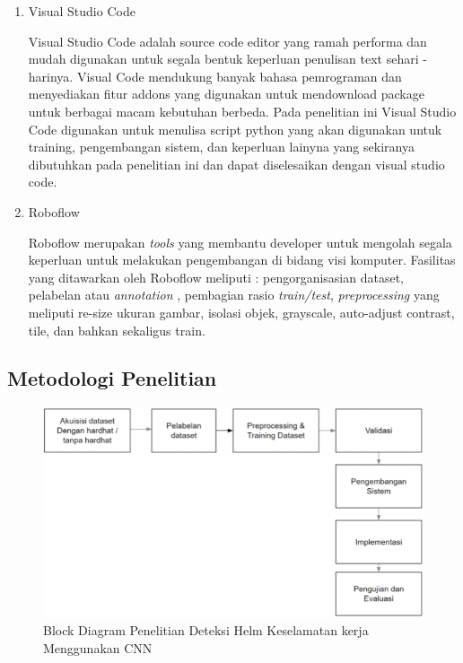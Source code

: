 \begin{enumerate}
\begin{enumerate}
    \item Visual Studio Code
    \par Visual Studio Code adalah source code editor yang ramah performa dan mudah digunakan untuk segala bentuk keperluan penulisan text sehari - harinya. Visual Code mendukung banyak bahasa pemrograman dan menyediakan fitur addons yang digunakan untuk mendownload package untuk berbagai macam kebutuhan berbeda. Pada penelitian ini Visual Studio Code digunakan untuk menulisa script python yang akan digunakan untuk training, pengembangan sistem, dan keperluan lainyna yang sekiranya dibutuhkan pada penelitian ini dan dapat diselesaikan dengan visual studio code.\cite{microsoft_2021}

    \item Roboflow
    \par Roboflow merupakan \emph{tools} yang membantu developer untuk mengolah segala keperluan untuk melakukan pengembangan di bidang visi komputer. Fasilitas yang ditawarkan oleh Roboflow meliputi : pengorganisasian dataset, 
    pelabelan atau \emph{annotation} , pembagian rasio \emph{train/test}, \emph{preprocessing} yang meliputi re-size ukuran gambar, isolasi objek, grayscale, auto-adjust contrast, tile, dan bahkan sekaligus train. 

  \end{enumerate}


\end{enumerate}



\subsection{Metodologi Penelitian}
\label{metodologipenelitian}

\begin{figure}[ht]
  \centering
  \includegraphics[scale=0.7]{gambar/blockdiagram-helmetdetection.png}
  \caption{Block Diagram Penelitian Deteksi Helm Keselamatan kerja Menggunakan CNN}
  \label{fig:blockdiagramhelmetdetection}  
\end{figure}

